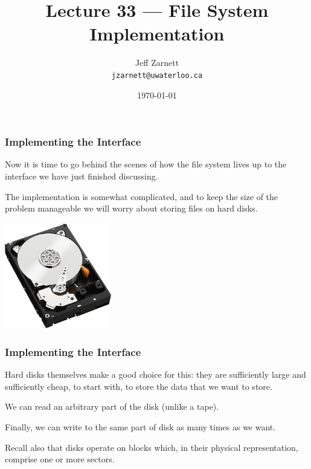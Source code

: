 

\title{Lecture 33 --- File System Implementation}

\author{Jeff Zarnett \\ \small \texttt{jzarnett@uwaterloo.ca}}
\date{\today}




\begin{frame}
  \titlepage

 \end{frame}



\begin{frame}
\frametitle{Implementing the Interface}

Now it is time to go behind the scenes of how the file system lives up to the interface we have just finished discussing. 

The implementation is somewhat complicated, and to keep the size of the problem manageable we will worry about storing files on hard disks.

\begin{center}
	\includegraphics[width=0.35\textwidth]{images/hdd.jpg}
\end{center}

 \end{frame}



\begin{frame}
\frametitle{Implementing the Interface}

 Hard disks themselves make a good choice for this: they are sufficiently large and sufficiently cheap, to start with, to store the data that we want to store. 
 
 We can read an arbitrary part of the disk (unlike a tape). 
 
Finally, we can write to the same part of disk as many times as we want. 
 
Recall also that disks operate on blocks which, in their physical representation, comprise one or more sectors.


\end{frame}

